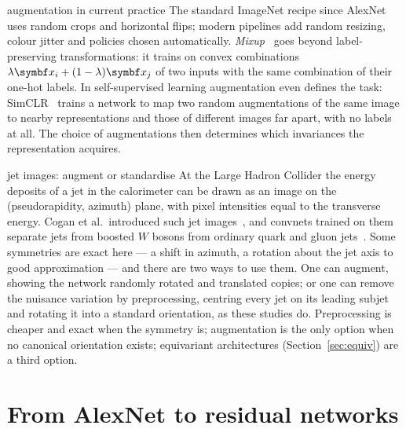 \documentclass[11pt]{article}
\begin{document}
\begin{modern}{augmentation in current practice}
The standard ImageNet recipe since AlexNet uses random crops and horizontal flips; modern pipelines add random
resizing, colour jitter and policies chosen automatically. \emph{Mixup}~\cite{zhang2018} goes beyond label-preserving
transformations: it trains on convex combinations $\lambda\x_i + (1 - \lambda)\x_j$ of two inputs with the same
combination of their one-hot labels. In self-supervised learning augmentation even defines the task: SimCLR~\cite{chen2020}
trains a network to map two random augmentations of the same image to nearby representations and those of different
images far apart, with no labels at all. The choice of augmentations then determines which invariances the representation
acquires.
\end{modern}

\begin{physics}{jet images: augment or standardise}
At the Large Hadron Collider the energy deposits of a jet in the calorimeter can be drawn as an image on the
(pseudorapidity, azimuth) plane, with pixel intensities equal to the transverse energy. Cogan et al.\ introduced such
jet images~\cite{cogan2015}, and convnets trained on them separate jets from boosted $W$ bosons from ordinary quark and
gluon jets~\cite{deoliveira2016}. Some symmetries are
exact here --- a shift in azimuth, a rotation about the jet axis to good approximation --- and there are two ways to use
them. One can augment, showing the network randomly rotated and translated copies; or one can remove the nuisance
variation by preprocessing, centring every jet on its leading subjet and rotating it into a standard orientation, as these
studies do. Preprocessing is cheaper and exact when the symmetry is; augmentation is the only option when no canonical
orientation exists; equivariant architectures (Section~\ref{sec:equiv}) are a third option.
\end{physics}

\section{From AlexNet to residual networks}\label{sec:history}
\end{document}
